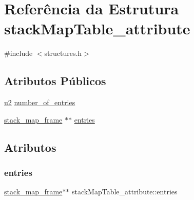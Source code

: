 \hypertarget{structstackMapTable__attribute}{}\section{Referência da Estrutura stack\+Map\+Table\+\_\+attribute}
\label{structstackMapTable__attribute}


{\ttfamily \#include $<$structures.\+h$>$}

\subsection*{Atributos Públicos}
\begin{DoxyCompactItemize}
\item 
\hyperlink{lista__operandos_8h_a732cde1300aafb73b0ea6c2558a7a54f}{u2} \hyperlink{structstackMapTable__attribute_a3bccf778bae6ecac485fb942eb82a478}{number\+\_\+of\+\_\+entries}
\item 
\hyperlink{structstack__map__frame}{stack\+\_\+map\+\_\+frame} $\ast$$\ast$ \hyperlink{structstackMapTable__attribute_a064170c738925362875e3337defc60d0}{entries}
\end{DoxyCompactItemize}


\subsection{Atributos}
\mbox{\label{structstackMapTable__attribute_a064170c738925362875e3337defc60d0}} 
\subsubsection{\texorpdfstring{entries}{entries}}
{\footnotesize\ttfamily \hyperlink{structstack__map__frame}{stack\+\_\+map\+\_\+frame}$\ast$$\ast$ stack\+Map\+Table\+\_\+attribute\+::entries}

\mbox{\label{structstackMapTable__attribute_a3bccf778bae6ecac485fb942eb82a478}} 
